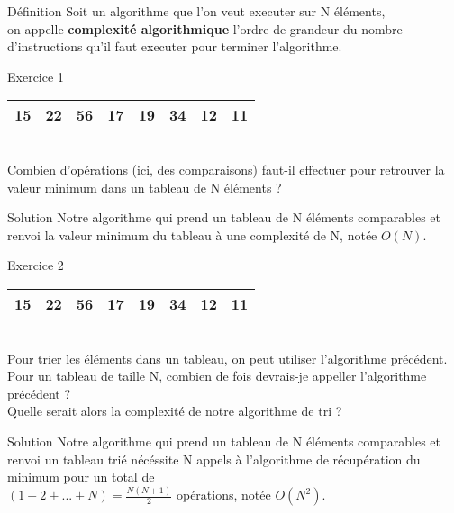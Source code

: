\begin{frame}{Définition}
    Soit un algorithme que l'on veut executer sur N éléments, \\
    on appelle \textbf{complexité algorithmique} l'ordre de grandeur du nombre d'instructions qu'il faut executer pour terminer l'algorithme.
\end{frame}

\begin{frame}{Exercice 1}
    \begin{tabular}{|r|r|r|r|r|r|r|r|}
        \hline
            15 & 22 & 56 & 17 & 19 & 34 & 12 & 11 \\
        \hline
    \end{tabular} \\
    \newline
    Combien d'opérations (ici, des comparaisons) faut-il effectuer 
    pour retrouver la valeur minimum dans un tableau de N éléments ?
\end{frame}

\begin{frame}{Solution}
    Notre algorithme qui prend un tableau de N éléments comparables et 
    renvoi la valeur minimum du tableau à une complexité de N, notée \textbf{$O(N)$}. \\
\end{frame}

\begin{frame}{Exercice 2}
    \begin{tabular}{|r|r|r|r|r|r|r|r|}
        \hline
            15 & 22 & 56 & 17 & 19 & 34 & 12 & 11 \\
        \hline
    \end{tabular} \\
    \newline
    Pour trier les éléments dans un tableau, on peut utiliser l'algorithme précédent.\\
    Pour un tableau de taille N, combien de fois devrais-je appeller l'algorithme précédent ?\\
    Quelle serait alors la complexité de notre algorithme de tri ?
\end{frame}

\begin{frame}{Solution}
    Notre algorithme qui prend un tableau de N éléments comparables et 
    renvoi un tableau trié nécéssite N appels à l'algorithme de récupération du minimum pour un total de \\
    \newline
    $(1+2+...+N)=\frac{N(N+1)}{2}$ opérations, notée \textbf{$O(N^2)$}. \\
\end{frame}

